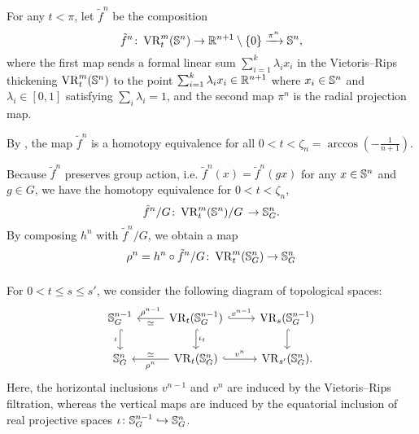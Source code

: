 For any $t<\pi$, let $\tilde{f}^n$ be the composition
\[
    \tilde{f}^n \colon \operatorname{VR}_t^m(\mathbb{S}^n) \to \mathbb{R}^{n+1} \setminus \{0\} \xrightarrow{\pi^n} \mathbb{S}^n,
\]
where the first map sends a formal linear sum $\sum_{i=1}^k \lambda_i x_i$ in the Vietoris--Rips thickening $\operatorname{VR}_t^m(\mathbb{S}^n)$ to the point $\sum_{i=1}^k \lambda_i x_i \in \mathbb{R}^{n+1}$ where $x_i \in \mathbb{S}^n$ and $\lambda_i \in [0,1]$ satisfying $\sum_i\lambda_i=1$, and the second map $\pi^n$ is the radial projection map.

By \cite[Proposition 5.3]{adamaszek2018metric}, the map $\tilde{f}^n$ is a homotopy equivalence for all $0<t<\zeta_n=\arccos{(-\tfrac{1}{n+1})}$.


Because $\tilde{f}^n$ preserves group action, i.e. $\tilde{f}^n(x) = \tilde{f}^n(gx)$ for any $x\in \mathbb{S}^n$ and $g\in G$, we have the homotopy equivalence for $0<t<\zeta_n$, %
\[
\tilde{f}^n/G \colon 
\operatorname{VR}_t^m(\mathbb{S}^n)/G \, 
\to \mathbb{S}^n_G.
\]
By composing $h^n$ with $\tilde{f}^n/G$, we obtain a map 
\[
\rho^n = h^n \circ \tilde{f}^n/G 
\colon \operatorname{VR}_t^m(\mathbb{S}^n_G) \to \mathbb{S}^n_G
\]

\subsubsection{} 

For $0<t\leq s \leq s'$, we consider the following diagram of topological spaces:
\begin{equation}\label{d:fundamental_bars_diagram}
    \begin{tikzcd}
        \bS^{n-1}_G
        \ar[d, hook,"{\iota}" left]
        &
        \VR_t(\bS^{n-1}_G)
        \ar[d, hook,"\iota_t"]
        \ar[l, "\rho^{n-1}" above, "\simeq" below]
        \ar[r, hook, "v^{n-1}"]
        &
        \VR_{s}(\bS^{n-1}_G)
        \ar[d, hook]
        \\
        \bS^{n}_G
        &
        \VR_t(\bS^{n}_G)
        \ar[l, "\rho^n" below, "\simeq" above]
        \ar[r, hook, "v^{n}"]
        &
        \VR_{s'}(\bS^{n}_G).
    \end{tikzcd}
\end{equation}
Here, the horizontal inclusions $v^{n-1}$ and $v^n$ are induced by the Vietoris--Rips filtration, whereas the vertical maps are induced by the equatorial inclusion of real projective spaces $\iota \colon \mathbb{S}^{n-1}_G \hookrightarrow \mathbb{S}^{n}_G$.

